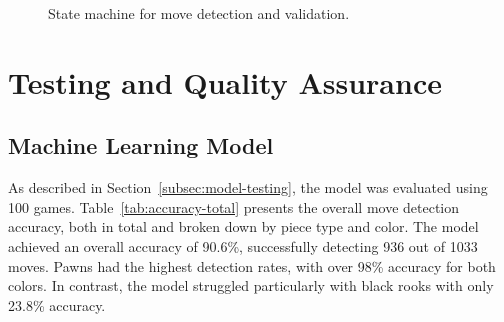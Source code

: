 \begin{figure}[H]
\begin{minipage}[t]{0.45\textwidth}
        \caption[State Machine Diagram]{State machine for move detection and validation.}
        \label{fig:state-machine}
    \end{minipage}
\end{figure}



\section{Testing and Quality Assurance}

\subsection{Machine Learning Model}
\label{machine-learning-test}

As described in Section~\ref{subsec:model-testing}, the model was evaluated using 100 games. Table~\ref{tab:accuracy-total} presents the overall move detection accuracy, both in total and broken down by piece type and color. The model achieved an overall accuracy of 90.6\%, successfully detecting 936 out of 1033 moves. Pawns had the highest detection rates, with over 98\% accuracy for both colors. In contrast, the model struggled particularly with black rooks with only 23.8\% accuracy.

